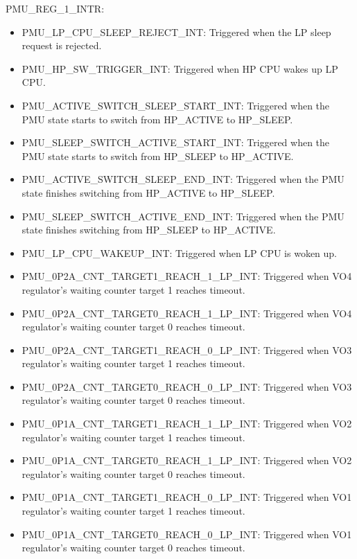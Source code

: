 \documentclass[main\_\_EN.tex]{subfiles}
\begin{document}
PMU\_REG\_1\_INTR:

\begin{itemize}
\item \label{int:PMULPCPUSLEEPREJECTINT}PMU\_LP\_CPU\_SLEEP\_REJECT\_INT: Triggered when the LP sleep request is rejected.

\item \label{int:PMUHPSWTRIGGERINT}PMU\_HP\_SW\_TRIGGER\_INT: Triggered when HP CPU wakes up LP CPU.

\item \label{int:PMUACTIVESWITCHSLEEPSTARTINT}PMU\_ACTIVE\_SWITCH\_SLEEP\_START\_INT: Triggered when the PMU state starts to switch from HP\_ACTIVE to HP\_SLEEP.

\item \label{int:PMUSLEEPSWITCHACTIVESTARTINT}PMU\_SLEEP\_SWITCH\_ACTIVE\_START\_INT: Triggered when the PMU state starts to switch from HP\_SLEEP to HP\_ACTIVE.

\item \label{int:PMUACTIVESWITCHSLEEPENDINT}PMU\_ACTIVE\_SWITCH\_SLEEP\_END\_INT: Triggered when the PMU state finishes switching from HP\_ACTIVE to HP\_SLEEP.

\item \label{int:PMUSLEEPSWITCHACTIVEENDINT}PMU\_SLEEP\_SWITCH\_ACTIVE\_END\_INT: Triggered when the PMU state finishes switching from HP\_SLEEP to HP\_ACTIVE.

\item \label{int:PMULPCPUWAKEUPINT}PMU\_LP\_CPU\_WAKEUP\_INT: Triggered when LP CPU is woken up.

\item \label{int:PMU0P2ACNTTARGET1REACH1LPINT}PMU\_0P2A\_CNT\_TARGET1\_REACH\_1\_LP\_INT: Triggered when VO4 regulator's waiting counter target 1 reaches timeout.
\item \label{int:PMU0P2ACNTTARGET0REACH1LPINT}PMU\_0P2A\_CNT\_TARGET0\_REACH\_1\_LP\_INT: Triggered when VO4 regulator's waiting counter target 0 reaches timeout.
\item \label{int:PMU0P2ACNTTARGET1REACH0LPINT}PMU\_0P2A\_CNT\_TARGET1\_REACH\_0\_LP\_INT: Triggered when VO3 regulator's waiting counter target 1 reaches timeout.
\item \label{int:PMU0P2ACNTTARGET0REACH0LPINT}PMU\_0P2A\_CNT\_TARGET0\_REACH\_0\_LP\_INT: Triggered when VO3 regulator's waiting counter target 0 reaches timeout.
\item \label{int:PMU0P1ACNTTARGET1REACH1LPINT}PMU\_0P1A\_CNT\_TARGET1\_REACH\_1\_LP\_INT: Triggered when VO2 regulator's waiting counter target 1 reaches timeout.
\item \label{int:PMU0P1ACNTTARGET0REACH1LPINT}PMU\_0P1A\_CNT\_TARGET0\_REACH\_1\_LP\_INT: Triggered when VO2 regulator's waiting counter target 0 reaches timeout.
\item \label{int:PMU0P1ACNTTARGET1REACH0LPINT}PMU\_0P1A\_CNT\_TARGET1\_REACH\_0\_LP\_INT: Triggered when VO1 regulator's waiting counter target 1 reaches timeout.
\item \label{int:PMU0P1ACNTTARGET0REACH0LPINT}PMU\_0P1A\_CNT\_TARGET0\_REACH\_0\_LP\_INT: Triggered when VO1 regulator's waiting counter target 0 reaches timeout.
\end{itemize}
\end{document}

